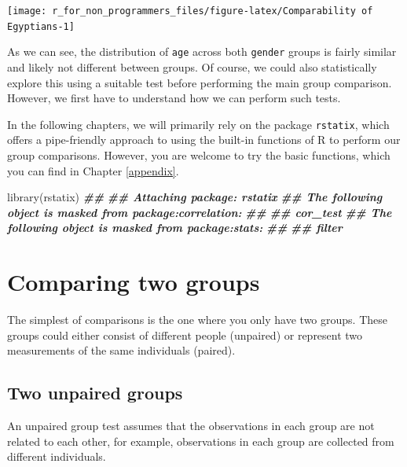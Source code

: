 \documentclass[
]{book}
\newenvironment{Shaded}{\begin{snugshade}}{\end{snugshade}}
\newcommand{\DocumentationTok}[1]{\textcolor[rgb]{0.56,0.35,0.01}{\textbf{\textit{#1}}}}
\newcommand{\FunctionTok}[1]{\textcolor[rgb]{0.00,0.00,0.00}{#1}}
\newcommand{\NormalTok}[1]{#1}
\begin{document}
\begin{center}\texttt{[image: r\_for\_non\_programmers\_files/figure-latex/Comparability of Egyptians-1]} \end{center}

As we can see, the distribution of \texttt{age} across both \texttt{gender} groups is fairly similar and likely not different between groups. Of course, we could also statistically explore this using a suitable test before performing the main group comparison. However, we first have to understand how we can perform such tests.

In the following chapters, we will primarily rely on the package \texttt{rstatix}, which offers a pipe-friendly approach to using the built-in functions of R to perform our group comparisons. However, you are welcome to try the basic functions, which you can find in Chapter \ref{appendix}.

\begin{Shaded}
\begin{Highlighting}[]
\FunctionTok{library}\NormalTok{(rstatix)}
\DocumentationTok{\#\# }
\DocumentationTok{\#\# Attaching package: \textquotesingle{}rstatix\textquotesingle{}}
\DocumentationTok{\#\# The following object is masked from \textquotesingle{}package:correlation\textquotesingle{}:}
\DocumentationTok{\#\# }
\DocumentationTok{\#\#     cor\_test}
\DocumentationTok{\#\# The following object is masked from \textquotesingle{}package:stats\textquotesingle{}:}
\DocumentationTok{\#\# }
\DocumentationTok{\#\#     filter}
\end{Highlighting}
\end{Shaded}

\hypertarget{comparing-two-groups}{%
\section{Comparing two groups}\label{comparing-two-groups}}

The simplest of comparisons is the one where you only have two groups. These groups could either consist of different people (unpaired) or represent two measurements of the same individuals (paired).

\hypertarget{two-unpaired-groups}{%
\subsection{Two unpaired groups}\label{two-unpaired-groups}}

An unpaired group test assumes that the observations in each group are not related to each other, for example, observations in each group are collected from different individuals.
\end{document}

